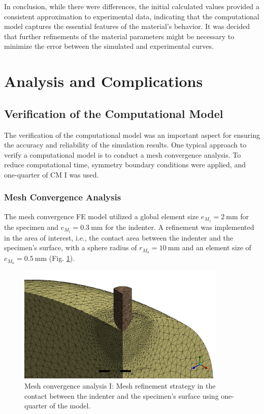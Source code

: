 In conclusion, while there were differences, the initial calculated values provided a consistent approximation to experimental
data, indicating that the computational model captures the essential features of the material's behavior.
It was decided that further refinements of the material parameters might be necessary to minimize the error between the 
simulated and experimental curves.

\section{Analysis and Complications}
\label{section:challengescm}
\subsection*{Verification of the Computational Model}
The verification of the computational model was an important aspect for ensuring the accuracy and reliability of the 
simulation results. One typical approach to verify a computational model is to conduct a mesh convergence analysis. To 
reduce computational time, symmetry boundary conditions were applied, and one-quarter of CM I was used.

\subsubsection*{Mesh Convergence Analysis}
The mesh convergence FE model utilized a global element size $e_{M_s}=\SI{2}{\milli\meter}$ for the specimen
and $e_{M_i}=\SI{0.3}{\milli\meter}$ for the indenter.
A refinement was implemented in the area of interest, i.e., the contact area between the indenter and the specimen's surface,
with a sphere radius of $r_{M_a}=\SI{10}{\milli\meter}$ and an element size of $e_{M_a}=\SI{0.5}{\milli\meter}$ (Fig. \ref{fig:meshconvergencecmI}).

\begin{figure}%
    \centering
   \quad
   \includegraphics[width=10cm]{Images/computational/meshzoom.png}%
   \caption[Mesh convergence model I]{Mesh convergence analysis I: Mesh refinement strategy in the contact between the indenter and the specimen's surface using one-quarter of the model.}%
   \label{fig:meshconvergencecmI}%
\end{figure}


